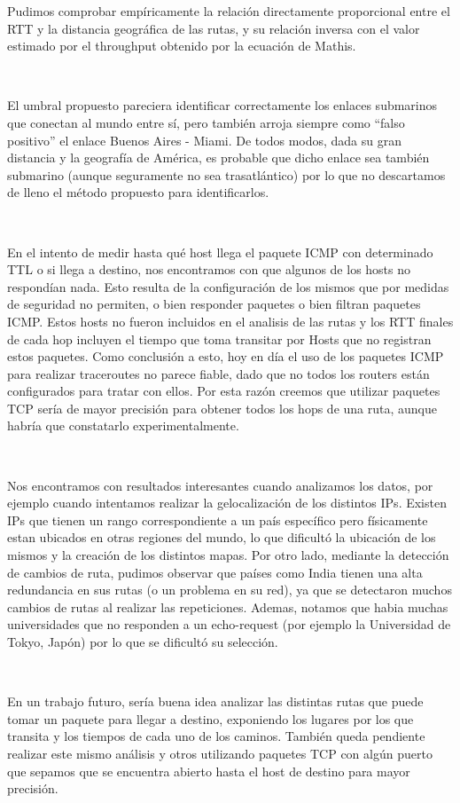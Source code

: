 Pudimos comprobar empíricamente la relación directamente proporcional entre el RTT y la distancia geográfica de las rutas, y su relación inversa con el valor estimado por el throughput obtenido por la ecuación de Mathis.

~

El umbral propuesto pareciera identificar correctamente los enlaces submarinos que conectan al mundo entre sí, pero también arroja siempre como ``falso positivo'' el enlace Buenos Aires - Miami. De todos modos, dada su gran distancia y la geografía de América, es probable que dicho enlace sea también submarino (aunque seguramente no sea trasatlántico) por lo que no descartamos de lleno el método propuesto para identificarlos.

~

En el intento de medir hasta qué host llega el paquete ICMP con determinado TTL o si llega a destino, nos encontramos con que algunos de los hosts no respondían nada. Esto resulta de la configuración de los mismos que por medidas de seguridad no permiten, o bien responder paquetes o bien filtran paquetes ICMP. Estos hosts no fueron incluidos en el analisis de las rutas y los RTT finales de cada hop incluyen el tiempo que toma transitar por Hosts que no registran estos paquetes. Como conclusión a esto, hoy en día el uso de los paquetes ICMP para realizar traceroutes no parece fiable, dado que no todos los routers están configurados para tratar con ellos. Por esta razón creemos que utilizar paquetes TCP sería de mayor precisión para obtener todos los hops de una ruta, aunque habría que constatarlo experimentalmente.

~

Nos encontramos con resultados interesantes cuando analizamos los datos, por ejemplo cuando intentamos realizar la gelocalización de los distintos IPs. Existen IPs que tienen un rango correspondiente a un país específico pero físicamente estan ubicados en otras regiones del mundo, lo que dificultó la ubicación de los mismos y la creación de los distintos mapas. Por otro lado, mediante la detección de cambios de ruta, pudimos observar que países como India tienen una alta redundancia en sus rutas (o un problema en su red), ya que se detectaron muchos cambios de rutas al realizar las repeticiones. Ademas, notamos que habia muchas universidades que no responden a un echo-request (por ejemplo la Universidad de Tokyo, Japón) por lo que se dificultó su selección.

~

En un trabajo futuro, sería buena idea analizar las distintas rutas que puede tomar un paquete para llegar a destino, exponiendo los lugares por los que transita y los tiempos de cada uno de los caminos. También queda pendiente realizar este mismo análisis y otros utilizando paquetes TCP con algún puerto que sepamos que se encuentra abierto hasta el host de destino para mayor precisión.
